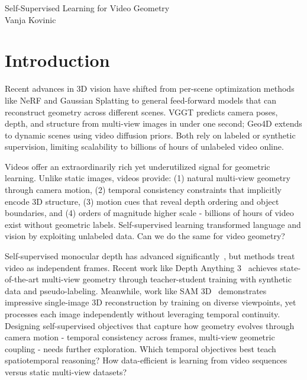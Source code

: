 \documentclass{article}
\begin{document}
\begin{center}
    \LARGE Self-Supervised Learning for Video Geometry\\[0.7em]  %
    \large Vanja Kovinic
    \vspace{1cm}
\end{center}

\section{Introduction}

Recent advances in 3D vision have shifted from per-scene optimization methods like NeRF \cite{nerf} and Gaussian Splatting \cite{gs} to general feed-forward models that can reconstruct geometry across different scenes. VGGT \cite{vggt} predicts camera poses, depth, and structure from multi-view images in under one second; Geo4D \cite{geo4d} extends to dynamic scenes using video diffusion priors. Both rely on labeled or synthetic supervision, limiting scalability to billions of hours of unlabeled video online.

Videos offer an extraordinarily rich yet underutilized signal for geometric learning. Unlike static images, videos provide: (1) natural multi-view geometry through camera motion, (2) temporal consistency constraints that implicitly encode 3D structure, (3) motion cues that reveal depth ordering and object boundaries, and (4) orders of magnitude higher scale - billions of hours of video exist without geometric labels. Self-supervised learning transformed language \cite{bert} and vision \cite{mae,dino} by exploiting unlabeled data. Can we do the same for video geometry?

Self-supervised monocular depth has advanced significantly~\cite{godard2019,watson2021}, but methods treat video as independent frames. Recent work like Depth Anything 3~\cite{da3} achieves state-of-the-art multi-view geometry through teacher-student training with synthetic data and pseudo-labeling. Meanwhile, work like SAM 3D~\cite{sam3d} demonstrates impressive single-image 3D reconstruction by training on diverse viewpoints, yet processes each image independently without leveraging temporal continuity. Designing self-supervised objectives that capture how geometry evolves through camera motion - temporal consistency across frames, multi-view geometric coupling - needs further exploration. Which temporal objectives best teach spatiotemporal reasoning? How data-efficient is learning from video sequences versus static multi-view datasets?
\end{document}
